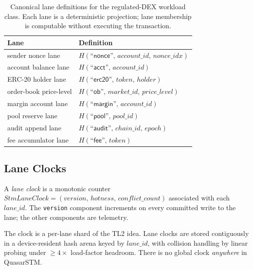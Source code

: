 \begin{table}[ht]
\centering
\begin{tabular}{@{}ll@{}}
\toprule
\textbf{Lane} & \textbf{Definition} \\
\midrule
sender nonce lane         & $H(\textsf{``nonce''},\, \mathit{account\_id},\, \mathit{nonce\_idx})$ \\
account balance lane      & $H(\textsf{``acct''},\, \mathit{account\_id})$ \\
ERC-20 holder lane        & $H(\textsf{``erc20''},\, \mathit{token},\, \mathit{holder})$ \\
order-book price-level    & $H(\textsf{``ob''},\, \mathit{market\_id},\, \mathit{price\_level})$ \\
margin account lane       & $H(\textsf{``margin''},\, \mathit{account\_id})$ \\
pool reserve lane         & $H(\textsf{``pool''},\, \mathit{pool\_id})$ \\
audit append lane         & $H(\textsf{``audit''},\, \mathit{chain\_id},\, \mathit{epoch})$ \\
fee accumulator lane      & $H(\textsf{``fee''},\, \mathit{token})$ \\
\bottomrule
\end{tabular}
\caption{Canonical lane definitions for the regulated-DEX workload
class. Each lane is a deterministic projection; lane membership is
computable without executing the transaction.}
\label{tab:lane-examples}
\end{table}

\subsection{Lane Clocks}

\begin{definition}
\label{def:lane-clock}
A \emph{lane clock} is a monotonic counter
$\mathit{StmLaneClock} = (\mathit{version},\, \mathit{hotness},\,
\mathit{conflict\_count})$ associated with each $\mathit{lane\_id}$.
The \texttt{version} component increments on every committed write
to the lane; the other components are telemetry.
\end{definition}

The clock is a per-lane shard of the TL2 idea. Lane clocks are stored
contiguously in a device-resident hash arena keyed by
$\mathit{lane\_id}$, with collision handling by linear probing under
$\geq 4 \times$ load-factor headroom. There is no global clock
\emph{anywhere} in QuasarSTM.


